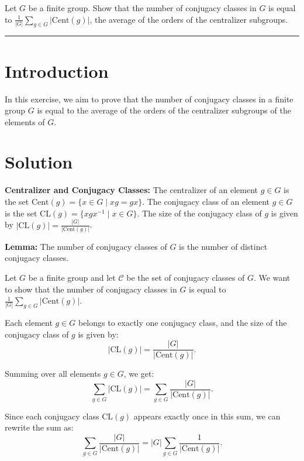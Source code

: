\documentclass[12pt]{amsart}
\theoremstyle{definition}
\numberwithin{equation}{section}
\begin{document}
\begin{exercise}{2} Let \(G\) be a finite group. Show that the number of conjugacy classes in \(G\) is equal to \(\frac{1}{|G|}\sum_{g \in G}|\text{Cent}(g)|\), the average of the orders of the centralizer subgroups.

    \noindent\rule{\linewidth}{1pt}

    \section*{Introduction}
    
    In this exercise, we aim to prove that the number of conjugacy classes in a finite group \(G\) is equal to the average of the orders of the centralizer subgroups of the elements of \(G\).

    \section*{Solution}
    
    \noindent \textbf{Centralizer and Conjugacy Classes:} The centralizer of an element \(g \in G\) is the set \(\text{Cent}(g) = \{x \in G \mid xg = gx\} \). The conjugacy class of an element \(g \in G\) is the set \(\text{CL}(g) = \{xgx^{-1} \mid x \in G\} \). The size of the conjugacy class of \(g\) is given by \(|\text{CL}(g)| = \frac{|G|}{|\text{Cent}(g)|}\).

    \noindent \textbf{Lemma:} The number of conjugacy classes of \(G\) is the number of distinct conjugacy classes.

    Let \(G\) be a finite group and let \(\mathcal{C}\) be the set of conjugacy classes of \(G\). We want to show that the number of conjugacy classes in \(G\) is equal to \(\frac{1}{|G|}\sum_{g \in G}|\text{Cent}(g)|\).

    Each element \(g \in G\) belongs to exactly one conjugacy class, and the size of the conjugacy class of \(g\) is given by:
    \[
    |\text{CL}(g)| = \frac{|G|}{|\text{Cent}(g)|}.
    \]

    Summing over all elements \(g \in G\), we get:
    \[
    \sum_{g \in G} |\text{CL}(g)| = \sum_{g \in G} \frac{|G|}{|\text{Cent}(g)|}.
    \]

    Since each conjugacy class \(\text{CL}(g)\) appears exactly once in this sum, we can rewrite the sum as:
    \[
    \sum_{g \in G} \frac{|G|}{|\text{Cent}(g)|} = |G| \sum_{g \in G} \frac{1}{|\text{Cent}(g)|}.
    \]


\end{exercise}
\end{document}

